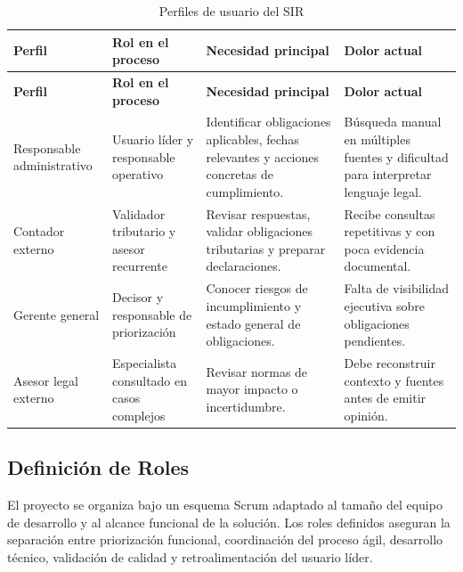 \documentclass[12pt,a4paper,oneside]{report}
\begin{document}
\begin{longtable}{p{}p{}p{}p{}}
\caption{Perfiles de usuario del SIR}\label{tab:cap3-perfiles-usuario}\\
\toprule
\textbf{Perfil} & \textbf{Rol en el proceso} & \textbf{Necesidad principal} & \textbf{Dolor actual} \\
\midrule
\endfirsthead
\toprule
\textbf{Perfil} & \textbf{Rol en el proceso} & \textbf{Necesidad principal} & \textbf{Dolor actual} \\
\midrule
\endhead
Responsable administrativo & Usuario líder y responsable operativo & Identificar obligaciones aplicables, fechas relevantes y acciones concretas de cumplimiento. & Búsqueda manual en múltiples fuentes y dificultad para interpretar lenguaje legal. \\
Contador externo & Validador tributario y asesor recurrente & Revisar respuestas, validar obligaciones tributarias y preparar declaraciones. & Recibe consultas repetitivas y con poca evidencia documental. \\
Gerente general & Decisor y responsable de priorización & Conocer riesgos de incumplimiento y estado general de obligaciones. & Falta de visibilidad ejecutiva sobre obligaciones pendientes. \\
Asesor legal externo & Especialista consultado en casos complejos & Revisar normas de mayor impacto o incertidumbre. & Debe reconstruir contexto y fuentes antes de emitir opinión. \\
\bottomrule
\end{longtable}

\subsection{Definición de Roles}\label{subsec:definicion-de-roles}

El proyecto se organiza bajo un esquema Scrum adaptado al tamaño del equipo de desarrollo y al alcance funcional de la solución. Los roles definidos aseguran la separación entre priorización funcional, coordinación del proceso ágil, desarrollo técnico, validación de calidad y retroalimentación del usuario líder.
\end{document}
